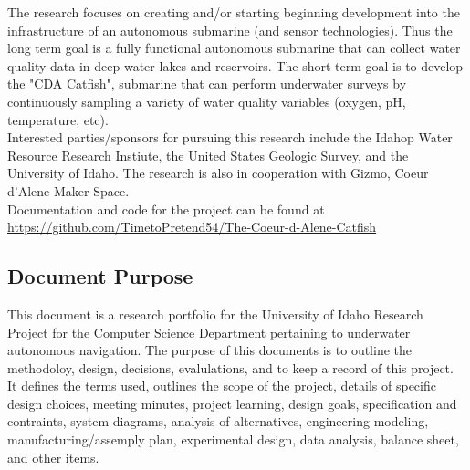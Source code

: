 \documentclass[12pt]{article}
\begin{document}
		The research focuses on creating and/or starting beginning development into the infrastructure of an autonomous submarine (and sensor technologies). Thus the long term goal is a fully functional autonomous submarine that can collect water quality data in deep-water lakes and reservoirs. The short term goal is to develop the "CDA Catfish", submarine that can perform underwater surveys by continuously sampling a variety of water quality variables (oxygen, pH, temperature, etc).\\
		Interested parties/sponsors for pursuing this research include the Idahop Water Resource Research Instiute, the United States Geologic Survey, and the University of Idaho. The research is also in cooperation with Gizmo, Coeur d'Alene Maker Space.\\
		Documentation and code for the project can be found at \url{https://github.com/TimetoPretend54/The-Coeur-d-Alene-Catfish}
		
		\subsection{Document Purpose}
			This document is a research portfolio for the University of Idaho Research Project for the Computer Science Department pertaining to underwater autonomous navigation. The purpose of this documents is to outline the methodoloy, design, decisions, evalulations, and to keep a record of this project. It defines the terms used, outlines the scope of the project, details of specific design choices, meeting minutes, project learning, design goals, specification and contraints, system diagrams, analysis of alternatives, engineering modeling, manufacturing/assemply plan, experimental design, data analysis, balance sheet, and other items.
		
\end{document}
